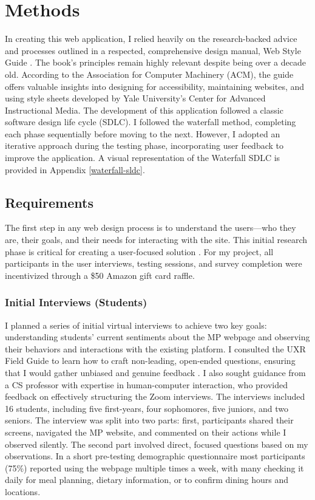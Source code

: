 \documentclass[10pt,twocolumn]{article}
\begin{document}
\section{Methods}

In creating this web application, I relied heavily on the research-backed advice and processes outlined in a respected, comprehensive design manual, Web Style Guide \cite{Web2009}. The book's principles remain highly relevant despite being over a decade old. According to the Association for Computer Machinery (ACM), the guide offers valuable insights into designing for accessibility, maintaining websites, and using style sheets developed by Yale University’s Center for Advanced Instructional Media.
The development of this application followed a classic software design life cycle (SDLC). I followed the waterfall method, completing each phase sequentially before moving to the next. However, I adopted an iterative approach during the testing phase, incorporating user feedback to improve the application. A visual representation of the Waterfall SDLC is provided in Appendix \ref{waterfall-sldc}.

\subsection{Requirements}
The first step in any web design process is to understand the users—who they are, their goals, and their needs for interacting with the site. This initial research phase is critical for creating a user-focused solution \cite{Web2009}.  For my project, all participants in the user interviews, testing sessions, and survey completion were incentivized through a \$50 Amazon gift card raffle.

\subsubsection{Initial Interviews (Students)}
I planned a series of initial virtual interviews to achieve two key goals: understanding students’ current sentiments about the MP webpage and observing their behaviors and interactions with the existing platform. I consulted the UXR Field Guide to learn how to craft non-leading, open-ended questions, ensuring that I would gather unbiased and genuine feedback \cite{UXR}. I also sought guidance from a CS professor with expertise in human-computer interaction, who provided feedback on effectively structuring the Zoom interviews.  The interviews included 16 students, including five first-years, four sophomores, five juniors, and two seniors. The interview was split into two parts: first, participants shared their screens, navigated the MP website, and commented on their actions while I observed silently. The second part involved direct, focused questions based on my observations. In a short pre-testing demographic questionnaire most participants (75\%) reported using the webpage multiple times a week, with many checking it daily for meal planning, dietary information, or to confirm dining hours and locations. 
\end{document}

